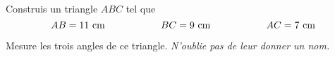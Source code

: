 \begin{myenumerate}
\item Construis un triangle $ABC$ tel que
\[AB=11~\mbox{cm}\kern2cm BC=9~\mbox{cm}\kern2cm AC=7~\mbox{cm}\]
\item Mesure les trois angles de ce triangle. {\em N'oublie pas de
leur donner un nom.}
\end{myenumerate}